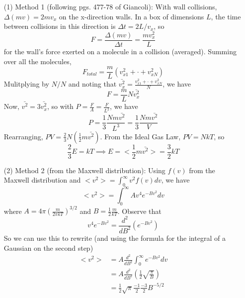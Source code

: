 \documentclass{article}
\begin{document}
\begin{itemize}
	\item[(1)] Method 1 (following pgs. 477-78 of Giancoli): With wall collisions, $\Delta (mv) = 2mv_x$ on the x-direction walls. In a box of dimensions $L$, the time between collisions in this direction is $\Delta t = 2L/v_x$, so
	\begin{equation}
	F = \frac{\Delta (mv)}{\Delta t} = \frac{mv_x^2}{L}
	\end{equation}
	for the wall's force exerted on a molecule in a collision (averaged). Summing over all the molecules,
	\begin{equation}
	F_{total} = \frac{m}{L}\left(v_{x1}^2 + \cdot + v_{xN}^2\right)
	\end{equation}
	Mulitplying by $N/N$ and noting that $\bar{v_x^2} = \frac{v_{x1}^2+ \cdot +v_{xN}^2}{N}$, we have
	\begin{equation}
	F = \frac{m}{L}N\bar{v_x^2}
	\end{equation}
	Now, $\bar{v^2}=3\bar{v_x^2}$, so with $P = \frac{F}{A} = \frac{F}{L^2}$, we have
	\begin{equation}
	P = \frac{1}{3}\frac{Nm\bar{v^2}}{L^3} = \frac{1}{3}\frac{Nm\bar{v^2}}{V}
	\end{equation}
	Rearranging, $PV = \frac{2}{3}N\left(\frac{1}{2}m\bar{v^2}\right)$. From the Ideal Gas Law, $PV = NkT$, so
	\begin{equation}
	\frac{2}{3}E = kT \implies E = <\frac{1}{2}m\bar{v^2}> = \frac{3}{2}kT
	\end{equation}
	\item[(2)] Method 2 (from the Maxwell distribution): Using $f(v)$ from the Maxwell distribution and $<v^2> = \int_0^{\infty} v^2f(v)dv$, we have
	\begin{equation}
	<v^2> = \int_0^{\infty} Av^4 e^{-Bv^2} dv
	\end{equation}
	where $A = 4\pi\left(\frac{m}{2\pi kT}\right)^{3/2}$ and $B = \frac{1}{2}\frac{m}{kT}$. Observe that
	\begin{equation}
	v^4 e^{-Bv^2} = \frac{d^2}{dB^2}\left(e^{-Bv^2}\right)
	\end{equation}
	So we can use this to rewrite (and using the formula for the integral of a Gaussian on the second step)
	\begin{align*}
	<v^2> &= A \frac{d^2}{dB^2}\int_0^{\infty} e^{-Bv^2}dv \\
	&= A\frac{d^2}{dB^2}\left(\frac{1}{2}\sqrt{\frac{\pi}{B}}\right) \\
	&= \frac{1}{2}\sqrt{\pi}\frac{-1}{2}\frac{-3}{2}B^{-5/2} \\

\end{align*}
\end{itemize}
\end{document}
